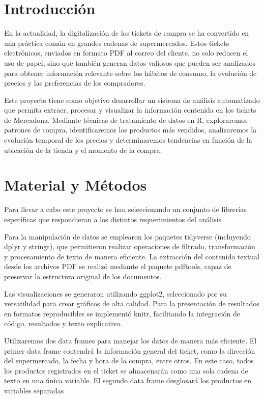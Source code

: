 \documentclass[,article,submit,moreauthors,pdftex]{Definitions/mdpi}
\begin{document}

\hypertarget{introducciuxf3n}{%
\section{Introducción}\label{introducciuxf3n}}

En la actualidad, la digitalización de los tickets de compra se ha
convertido en una práctica común en grandes cadenas de supermercados.
Estos tickets electrónicos, enviados en formato PDF al correo del
cliente, no solo reducen el uso de papel, sino que también generan datos
valiosos que pueden ser analizados para obtener información relevante
sobre los hábitos de consumo, la evolución de precios y las preferencias
de los compradores.

Este proyecto tiene como objetivo desarrollar un sistema de análisis
automatizado que permita extraer, procesar y visualizar la información
contenida en los tickets de Mercadona. Mediante técnicas de tratamiento
de datos en R, exploraremos patrones de compra, identificaremos los
productos más vendidos, analizaremos la evolución temporal de los
precios y determinaremos tendencias en función de la ubicación de la
tienda y el momento de la compra.

\hypertarget{material-y-muxe9todos}{%
\section{Material y Métodos}\label{material-y-muxe9todos}}

Para llevar a cabo este proyecto se han seleccionando un conjunto de
librerías específicas que respondieran a los distintos requerimientos
del análisis.

Para la manipulación de datos se emplearon los paquetes tidyverse
(incluyendo dplyr y stringr), que permitieron realizar operaciones de
filtrado, transformación y procesamiento de texto de manera eficiente.
La extracción del contenido textual desde los archivos PDF se realizó
mediante el paquete pdftools, capaz de preservar la estructura original
de los documentos.

Las visualizaciones se generaron utilizando ggplot2, seleccionado por su
versatilidad para crear gráficos de alta calidad. Para la presentación
de resultados en formatos reproducibles se implementó knitr, facilitando
la integración de código, resultados y texto explicativo.

Utilizaremos dos data frames para manejar los datos de manera más
eficiente. El primer data frame contendrá la información general del
ticket, como la dirección del supermercado, la fecha y hora de la
compra, entre otros. En este caso, todos los productos registrados en el
ticket se almacenarán como una sola cadena de texto en una única
variable. El segundo data frame desglosará los productos en variables
separadas
\end{document}
